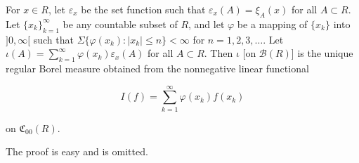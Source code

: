 For $x \in R$, let $\varepsilon_x$ be the set function such that $\varepsilon_x(A) = \xi_A(x)$ for all $A \subset R$. Let $\{x_k\}_{k=1}^{\infty}$ be any countable subset of $R$, and let $\varphi$ be a mapping of $\{x_k\}$ into $]0, \infty[$ such that $\Sigma\{\varphi(x_k) : |x_k| \leq n\} < \infty$ for $n = 1, 2, 3, \dots$. Let $\iota(A) = \sum_{k=1}^{\infty} \varphi(x_k) \varepsilon_x(A)$ for all $A \subset R$. Then $\iota$ [on $\mathcal{B}(R)$] is the unique regular Borel measure obtained from the nonnegative linear functional

$$I(f) = \sum_{k=1}^{\infty} \varphi(x_k) f(x_k)$$

on $\mathfrak{C}_{00}(R)$.

The proof is easy and is omitted.